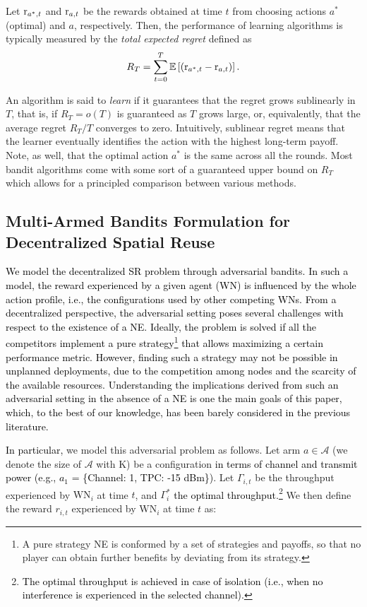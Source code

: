 \documentclass{article}
\begin{document}
	Let ${\rm r}_{a^*,t}$ and ${\rm r}_{a,t}$ be the rewards obtained at time $t$ from choosing actions $a^*$ (optimal) and $a$, respectively. Then, the performance of learning algorithms is typically measured by the \emph{total expected regret} defined as  \[R_T = \sum_{t=0}^{T} \mathbb{E}\left[\left({\rm r}_{a^*,t} - {\rm r}_{a,t}\right)\right].\]
	
	An algorithm is said to \emph{learn} if it guarantees that the regret grows sublinearly in $T$, that is, if $R_T = o(T)$ is guaranteed as $T$ grows large, or, equivalently, that the average regret $R_T/T$ converges to zero. Intuitively, sublinear regret means that the learner eventually identifies the action with the highest long-term payoff. Note, as well, that the optimal action $a^*$ is the same across all the rounds. Most bandit algorithms come with some sort of a guaranteed upper bound on $R_T$ which allows for a principled comparison between various methods. 
	
	\subsection{Multi-Armed Bandits Formulation for Decentralized Spatial Reuse}
	
	\textcolor{black}{We model the decentralized SR problem through adversarial bandits. In such a model, the reward experienced by a given agent (WN) is influenced by the whole action profile, i.e., the configurations used by other competing WNs. From a decentralized perspective, the adversarial setting poses several challenges with respect to the existence of a NE. Ideally, the problem is solved if all the competitors implement a pure strategy\footnote{A pure strategy NE is conformed by a set of strategies and payoffs, so that no player can obtain further benefits by deviating from its strategy.} that allows maximizing a certain performance metric. However, finding such a strategy may not be possible in unplanned deployments, due to the competition among nodes and the scarcity of the available resources. Understanding the implications derived from such an adversarial setting in the absence of a NE is one the main goals of this paper, which, to the best of our knowledge, has been barely considered in the previous literature.}
	
	\textcolor{black}{In particular,} we model this adversarial problem as follows. Let arm $a \in \mathcal{A}$ (we denote the size of $\mathcal{A}$ with K) be a configuration \textcolor{black}{in terms of channel and transmit power (e.g., $a_1$ = \{Channel: 1, TPC: -15 dBm\})}. Let $\Gamma_{i,t}$ be the throughput experienced by $\text{WN}_i$ at time $t$, and $\Gamma_{i}^*$ \textcolor{black}{the optimal throughput.}\footnote{\textcolor{black}{The optimal throughput is achieved in case of isolation (i.e., when no interference is experienced in the selected channel).}} We then define the reward $r_{i,t}$ experienced by $\text{WN}_i$ at time $t$ as:
	
\end{document}
